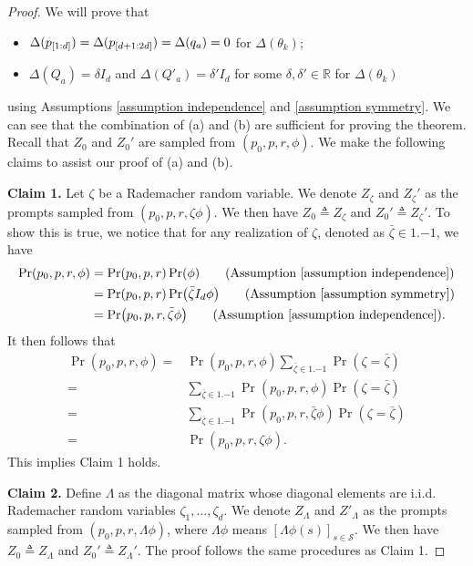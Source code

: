 \documentclass{article}
\newcommand{\explain}[1]{\tag*{(#1)}}
\newcommand{\fS}{\mathcal{S}}
\newcommand{\R}{\mathbb{R}}
\begin{document}
\begin{proof}
We will prove that 
\begin{itemize}
    \item[(a)] $\Delta(p_\qty[{1:d}]) = \Delta(p_\qty[{d+1:2d}]) = \Delta(q_a) = 0$ for $\Delta (\theta_k)$;
     \item[(b)] $\Delta(Q_a) = \delta I_d$ and $\Delta(Q'_a) = \delta' I_d$ for some $\delta, \delta' \in\R$ for $\Delta(\theta_k)$
\end{itemize}
using Assumptions \ref{assumption independence} and \ref{assumption symmetry}.
We can see that the combination of (a) and (b) are sufficient for proving the theorem.
Recall that $Z_0$ and $Z_0'$ are sampled from $(p_0, p, r, \phi)$.
We make the following claims to assist our proof of (a) and (b).

\textbf{Claim 1.}
Let $\zeta$ be a Rademacher random variable.
We denote $Z_\zeta$ and $Z_\zeta'$ as the prompts sampled from $(p_0, p, r, \zeta \phi)$. We then have $Z_0 \triangleq Z_\zeta$ and $Z_0' \triangleq Z_\zeta'$.
To show this is true, we notice that for any realization of $\zeta$, denoted as $\bar \zeta \in \qty{1, -1}$,
we have
\begin{align}
    \Pr(p_0, p, r, \phi) &= \Pr(p_0, p, r)\Pr(\phi) \explain{Assumption~\ref{assumption independence}}\\
    &= \Pr(p_0, p, r)\Pr(\bar \zeta I_d \phi) \explain{Assumption~\ref{assumption symmetry}}\\
    &= \Pr(p_0, p, r, \bar \zeta \phi) \explain{Assumption~\ref{assumption independence}}.
\end{align}
It then follows that
\begin{align}
    \Pr(p_0, p, r, \phi) =& \Pr(p_0, p, r, \phi) \sum_{\bar \zeta \in \qty{1, -1}}  \Pr(\zeta = \bar \zeta) \\
    =&  \sum_{\bar \zeta \in \qty{1, -1}}  \Pr(p_0, p, r, \phi) \Pr(\zeta = \bar \zeta) \\
    =&  \sum_{\bar \zeta \in \qty{1, -1}}  \Pr(p_0, p, r, \bar \zeta \phi) \Pr(\zeta = \bar \zeta) \\
    =& \Pr(p_0, p, r, \zeta \phi).
\end{align}
This implies Claim 1 holds.

\textbf{Claim 2.}
Define $\Lambda$ as the diagonal matrix whose diagonal elements are i.i.d. Rademacher random variables $\zeta_1, \dots, \zeta_d$.
We denote $Z_\Lambda$ and $Z'_\Lambda$ as the prompts sampled from $(p_0, p, r, \Lambda\phi)$, where $\Lambda\phi$ means $[\Lambda\phi(s)]_{s\in\fS}$.
We then have $Z_0 \triangleq Z_\Lambda$ and $Z_0' \triangleq Z_\Lambda'$.
The proof follows the same procedures as Claim 1.


\end{proof}
\end{document}
